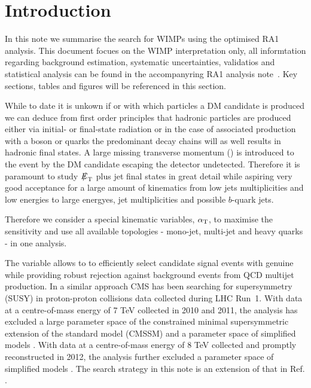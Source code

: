 \section{Introduction}
\label{sec:intro}

In this note we summarise the search for WIMPs using the optimised RA1 analysis. This document focues on the WIMP interpretation only, all informtation regarding background estimation, 
systematic uncertainties, validatios and statistical analysis can be found in the accompanyring RA1 analysis note~\cite{alphaTnote}. Key sections, tables and figures will be referenced in this section.


While to date it is unkown if or with which particles a DM candidate is produced we can deduce from first order principles that hadronic particles are produced either via initial- or final-state radiation or in the case of associated production with a boson or quarks the predominant decay chains will as well results in hadronic final states.
A large missing transverse momentum (\MET) is introduced to the event by the DM candidate escaping the detector undetected. Therefore it is paramount to study $\etmiss$ plus jet final states in great detail while aspiring very good acceptance for a large amount of kinematics from low jets multiplicities and low energies to large energyes, jet multiplicities and possible $b$-quark jets.

Therefore we consider a special kinematic variables,  $\alpha_{\textrm T}$, to maximise the sensitivity and use all available topologies - mono-jet, multi-jet and heavy quarks - in one analysis. 

The \alphat variable allows to to efficiently select candidate signal events with genuine \MET while
providing robust rejection against background events from QCD multijet production. 
In a similar approach CMS has been searching for supersymmetry (SUSY) in proton-proton collisions data collected during LHC Run~1. With data at a centre-of-mass energy of 7 TeV collected in
2010 and 2011, the \alphat analysis has excluded a large parameter space of the constrained minimal supersymmetric extension of the
standard model (CMSSM) \cite{Khachatryan:2011tk, Chatrchyan:2011zy, Chatrchyan:2012wa} and a parameter space of simplified models
\cite{Chatrchyan:2012wa}. With data at a centre-of-mass energy of 8 TeV collected and promptly reconstructed in 2012, the \alphat analysis
further excluded a parameter space of simplified models \cite{Chatrchyan:2013lya}. 
The search strategy in this note is an extension of that in Ref. \cite{CMS_AN_2013-366}.

